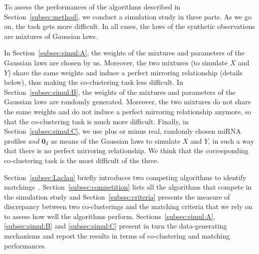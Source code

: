 To    assess   the    performances    of   the    algorithms   described    in
Section~\ref{subsec:method}, we conduct a simulation study in three parts.  As
we  go on,  the task  gets more  difficult.   In all  cases, the  laws of  the
synthetic  observations  are  mixtures  of  Gaussian  laws.   


In Section~\ref{subsec:simul:A}, the weights of the mixtures and parameters of
the Gaussian  laws are chosen by  us. Moreover, the two  mixtures (to simulate
$X$  and  $Y$)  share  the  same   weights  and  induce  a  perfect  mirroring
relationship  (details  below),  thus   making  the  co-clustering  task  less
difficult.  In  Section~\ref{subsec:simul:B}, the weights of  the mixtures and
parameters  of the  Gaussian laws  are randomly  generated. Moreover,  the two
mixtures do not share  the same weights and do not  induce a perfect mirroring
relationship anymore, so  that the co-clustering task is  much more difficult.
Finally, in Section~\ref{subsec:simul:C}, we use  plus or minus real, randomly
chosen miRNA profiles  \textit{and} $\textbf{0}_{d}$ as means  of the Gaussian
laws to simulate $X$ and $Y$, in such a way that there is no perfect mirroring
relationship.  We think that the  corresponding co-clustering task is the most
difficult of the three.

Section~\ref{subsec:Laclau}  briefly introduces  two  competing algorithms  to
identify  matchings~\cite{Laclau17}.   Section~\ref{subsec:competition}  lists
all   the   algorithms   that   compete    in   the   simulation   study   and
Section~\ref{subsec:criteria} presents the measure  of discrepancy between two
co-clusterings and  the matching criteria that  we rely on to  assess how well
the  algorithms perform.   Sections~\ref{subsec:simul:A}, \ref{subsec:simul:B}
and \ref{subsec:simul:C}  present in  turn the data-generating  mechanisms and
report the results in terms of co-clustering and matching performances.

